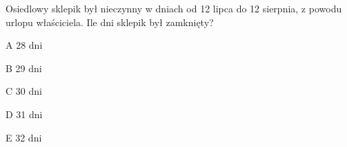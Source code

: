 \begin{tresc}
Osiedlowy sklepik był nieczynny w dniach od 12 lipca do 12 sierpnia, z powodu urlopu właściciela. Ile dni sklepik był zamknięty?
\end{tresc}
\begin{wariant}{A} 28 dni \end{wariant}
\begin{wariant}{B} 29 dni \end{wariant}
\begin{wariant}{C} 30 dni \end{wariant}
\begin{wariant}{D} 31 dni \end{wariant}
\begin{wariant}{E} 32 dni \end{wariant}
